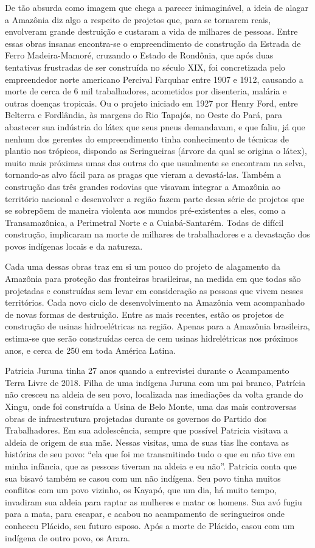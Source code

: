 De tão absurda como imagem que chega a parecer inimaginável, a ideia de
alagar a Amazônia diz algo a respeito de projetos que, para se tornarem
reais, envolveram grande destruição e custaram a vida de milhares de
pessoas. Entre essas obras insanas encontra-se o empreendimento de
construção da Estrada de Ferro Madeira-Mamoré, cruzando o Estado de
Rondônia, que após duas tentativas frustradas de ser construída no
século XIX, foi concretizada pelo empreendedor norte americano Percival
Farquhar entre 1907 e 1912, causando a morte de cerca de 6 mil
trabalhadores, acometidos por disenteria, malária e outras doenças
tropicais. Ou o projeto iniciado em 1927 por Henry Ford, entre Belterra
e Fordlândia, às margens do Rio Tapajós, no Oeste do Pará, para
abastecer sua indústria do látex que seus pneus demandavam, e que faliu,
já que nenhum dos gerentes do empreendimento tinha conhecimento de
técnicas de plantio nos trópicos, dispondo as Seringueiras (árvore da
qual se origina o látex), muito mais próximas umas das outras do que
usualmente se encontram na selva, tornando-as alvo fácil para as pragas
que vieram a devastá-las. Também a construção das três grandes rodovias
que visavam integrar a Amazônia ao território nacional e desenvolver a
região fazem parte dessa série de projetos que se sobrepõem de maneira
violenta aos mundos pré-existentes a eles, como a Transamazônica, a
Perimetral Norte e a Cuiabá-Santarém. Todas de difícil construção,
implicaram na morte de milhares de trabalhadores e a devastação dos
povos indígenas locais e da natureza.

Cada uma dessas obras traz em si um pouco do projeto de alagamento da
Amazônia para proteção das fronteiras brasileiras, na medida em que
todas são projetadas e construídas sem levar em consideração as pessoas
que vivem nesses territórios. Cada novo ciclo de desenvolvimento na
Amazônia vem acompanhado de novas formas de destruição. Entre as mais
recentes, estão os projetos de construção de usinas hidroelétricas na
região. Apenas para a Amazônia brasileira, estima-se que serão
construídas cerca de cem usinas hidrelétricas nos próximos anos, e cerca
de 250 em toda América Latina.

Patricia Juruna tinha 27 anos quando a entrevistei durante o Acampamento
Terra Livre de 2018. Filha de uma indígena Juruna com um pai branco,
Patrícia não cresceu na aldeia de seu povo, localizada nas imediações da
volta grande do Xingu, onde foi construída a Usina de Belo Monte, uma
das mais controversas obras de infraestrutura projetadas durante os
governos do Partido dos Trabalhadores. Em sua adolescência, sempre que
possível Patricia visitava a aldeia de origem de sua mãe. Nessas
visitas, uma de suas tias lhe contava as histórias de seu povo: ``ela
que foi me transmitindo tudo o que eu não tive em minha infância, que as
pessoas tiveram na aldeia e eu não''. Patricia conta que sua bisavó
também se casou com um não indígena. Seu povo tinha muitos conflitos com
um povo vizinho, os Kayapó, que um dia, há muito tempo, invadiram sua
aldeia para raptar as mulheres e matar os homens. Sua avó fugiu para a
mata, para escapar, e acabou no acampamento de seringueiros onde
conheceu Plácido, seu futuro esposo. Após a morte de Plácido, casou com
um indígena de outro povo, os Arara.

